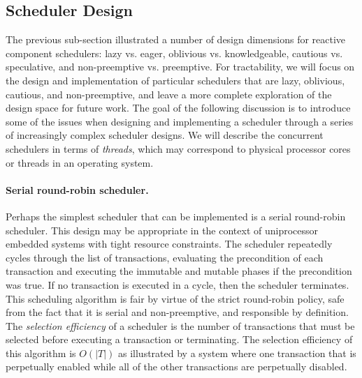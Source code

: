 \subsection{Scheduler Design}

The previous sub-section illustrated a number of design dimensions for reactive component schedulers:  lazy vs. eager, oblivious vs. knowledgeable, cautious vs. speculative, and non-preemptive vs. preemptive.
For tractability, we will focus on the design and implementation of particular schedulers that are lazy, oblivious, cautious, and non-preemptive, and leave a more complete exploration of the design space for future work.
The goal of the following discussion is to introduce some of the issues when designing and implementing a scheduler through a series of increasingly complex scheduler designs.
We will describe the concurrent schedulers in terms of \emph{threads}, which may correspond to physical processor cores or threads in an operating system.


\paragraph{Serial round-robin scheduler.}
Perhaps the simplest scheduler that can be implemented is a serial round-robin scheduler.
This design may be appropriate in the context of uniprocessor embedded systems with tight resource constraints.
The scheduler repeatedly cycles through the list of transactions, evaluating the precondition of each transaction and executing the immutable and mutable phases if the precondition was true.
If no transaction is executed in a cycle, then the scheduler terminates.
This scheduling algorithm is fair by virtue of the strict round-robin policy, safe from the fact that it is serial and non-preemptive, and responsible by definition.
The \emph{selection efficiency} of a scheduler is the number of transactions that must be selected before executing a transaction or terminating.
The selection efficiency of this algorithm is $O(|T|)$ as illustrated by a system where one transaction that is perpetually enabled while all of the other transactions are perpetually disabled.

